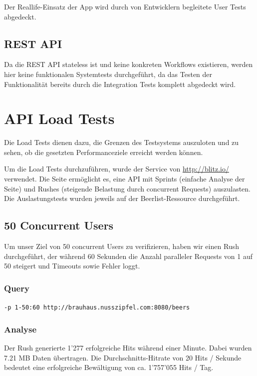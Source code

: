 \documentclass[10pt,a4paper]{scrartcl}
\begin{document}
Der Reallife-Einsatz der App wird durch von Entwicklern begleitete User Tests abgedeckt.

\subsection{REST API}

Da die REST API stateless ist und keine konkreten Workflows existieren, werden hier keine
funktionalen Systemtests durchgeführt, da das Testen der Funktionalität bereits durch die
Integration Tests komplett abgedeckt wird.


\section{API Load Tests}

Die Load Tests dienen dazu, die Grenzen des Testsystems auszuloten und zu sehen, ob die
gesetzten Performanceziele erreicht werden können.

Um die Load Tests durchzuführen, wurde der Service von \url{http://blitz.io/} verwendet. Die Seite
ermöglicht es, eine API mit Sprints (einfache Analyse der Seite) und Rushes (steigende Belastung
durch concurrent Requests) auszulasten. Die Auslastungstests wurden jeweils auf der
Beerlist-Ressource durchgeführt.


\subsection{50 Concurrent Users}

Um unser Ziel von 50 concurrent Users zu verifizieren, haben wir einen Rush durchgeführt, der während
60 Sekunden die Anzahl paralleler Requests von 1 auf 50 steigert und Timeouts sowie Fehler loggt.

\subsubsection*{Query}

\texttt{-p 1-50:60 http://brauhaus.nusszipfel.com:8080/beers}

\subsubsection*{Analyse}

Der Rush generierte 1'277 erfolgreiche Hits während einer Minute. Dabei wurden 7.21 MB Daten übertragen.
Die Durchschnitts-Hitrate von 20 Hits / Sekunde bedeutet eine erfolgreiche Bewältigung von ca. 1'757'055
Hits / Tag.
\end{document}
